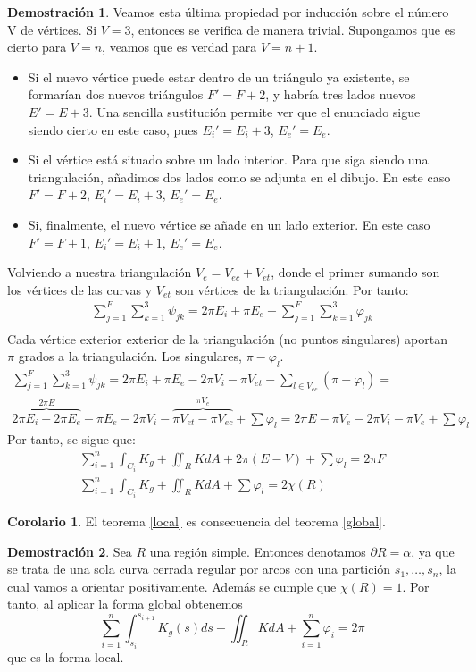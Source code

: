 \documentclass[twoside]{report}
\theoremstyle{definition}
\newtheorem{coro}[theorem]{Corolario}
\newtheorem*{dem}{Demostración}
\numberwithin{equation}{section}
\begin{document}
\begin{dem}
Veamos esta última propiedad por inducción sobre el número V de vértices. Si $V=3$, entonces se verifica de manera trivial. Supongamos que es cierto para $V=n$, veamos que es verdad para $V=n+1$. 
\begin{itemize}
\item Si el nuevo vértice puede estar dentro de un triángulo ya existente, se formarían dos nuevos triángulos $F' = F+2$, y habría tres lados nuevos $E'=E+3$. Una sencilla sustitución permite ver que el enunciado sigue siendo cierto en este caso, pues $E_i' = E_i+3$, $E_e'=E_e$.
\item Si el vértice está situado sobre un lado interior. Para que siga siendo una triangulación, añadimos dos lados como se adjunta en el dibujo. En este caso $F'=F+2$, $E_i'=E_i+3$, $E_e'=E_e$. 
\item Si, finalmente, el nuevo vértice se añade en un lado exterior. En este caso $F'=F+1$, $E_i'=E_i+1$, $E_e'=E_e$.
\end{itemize}
Volviendo a nuestra triangulación $V_e=V_{ec}+V_{et}$, donde el primer sumando son los vértices de las curvas y $V_{et}$ son vértices de la triangulación. Por tanto:
\begin{gather*}
\sum_{j=1}^F\sum_{k=1}^3 \psi_{jk} = 2\pi E_i + \pi E_e - \sum_{j=1}^F\sum_{k=1}^3 \varphi_{jk}\\
\end{gather*}
Cada vértice exterior exterior de la triangulación (no puntos singulares) aportan $\pi$ grados a la triangulación. Los singulares, $\pi - \varphi_l$.
\begin{gather*}
\sum_{j=1}^F\sum_{k=1}^3 \psi_{jk} =  2\pi E_i + \pi E_e - 2\pi V_i-\pi V_{et} - \sum_{l\in V_{ec}} (\pi - \varphi_l) = \\
\overbrace{ 2\pi E_i + 2\pi E_e }^{2\pi E}- \pi E_e - 2\pi V_i-\overbrace{\pi V_{et}-\pi V_{ec}}^{\pi V_e}  +\sum \varphi_l  = 2\pi E - \pi V_e - 2\pi V_i - \pi V_e + \sum \varphi_l
\end{gather*}
Por tanto, se sigue que:
\begin{gather*}
\sum_{i=1}^n \int_{C_i}K_g + \iint_R K dA +   2\pi( E -V) + \sum \varphi_l = 2\pi F\\
\sum_{i=1}^n \int_{C_i}K_g + \iint_R K dA + \sum \varphi_l = 2 \chi(R)
\end{gather*}
\end{dem}

\begin{coro}
El teorema \ref{local} es consecuencia del teorema \ref{global}. 
\end{coro}
\begin{dem}
Sea $R$ una región simple. Entonces denotamos $\partial R=\alpha$, ya que se trata de una sola curva cerrada regular por arcos con una partición $s_1,\dots, s_n$, la cual vamos a orientar positivamente. Además se cumple que $\chi(R)=1$. Por tanto, al aplicar la forma global obtenemos
\[
\sum_{i=1}^n\int_{s_i}^{s_{i+1}}K_g(s)ds +\iint_R KdA+\sum_{i=1}^n\varphi_i=2\pi
\]
que es la forma local.
\end{dem}
\end{document}
